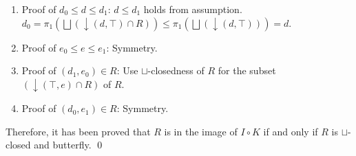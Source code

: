 \documentclass{llncs}
\newcommand{\join}{\sqcup}
\newcommand{\bigjoin}{\bigsqcup}
\newcommand{\comp}{\circ}
\begin{document}
\begin{enumerate}[i.]
        \begin{enumerate}[]
          \item{Proof of $d_{0} \leq d \leq d_{1}$:} $d \leq d_{1}$ holds from assumption. $d_{0} = \pi_{1} (\bigjoin(\downarrow (d , \top) \cap R)) \leq \pi_{1} (\bigjoin(\downarrow (d , \top))) = d$.
          \item{Proof of $e_{0} \leq e \leq e_{1}$:} Symmetry.
          \item{Proof of $(d_{1}, e_{0}) \in R$:} Use $\join$-closedness of $R$ for the subset $(\downarrow (\top , e) \cap R)$ of $R$.
          \item{Proof of $(d_{0}, e_{1}) \in R$:} Symmetry.
        \end{enumerate}
\end{enumerate}
Therefore, it has been proved that $R$ is in the image of $I \comp K$ if and only if $R$ is $\join$-closed and butterfly. \qed
\end{document}
